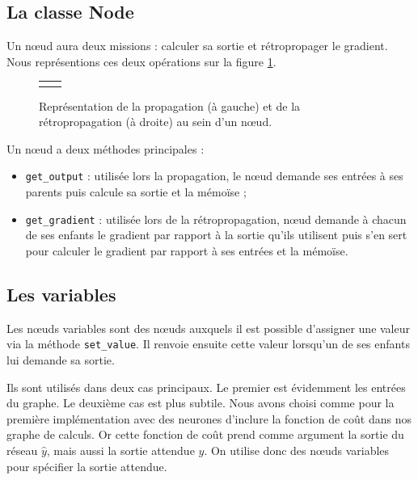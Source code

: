 \subsection{La classe Node}

Un n\oe{}ud aura deux missions : calculer sa sortie et rétropropager le gradient. Nous représentions ces deux opérations sur la figure \ref{node}.

\begin{figure}
\begin{center}
\begin{tabular}{cc}
 &  \\
\end{tabular}
\end{center}
\caption{Représentation de la propagation (à gauche) et de la rétropropagation (à droite) au sein d'un n\oe{}ud.}
\label{node}
\end{figure}

Un n\oe{}ud a deux méthodes principales :
\begin{itemize}
\item \texttt{get\_output} : utilisée lors la propagation, le n\oe{}ud demande ses entrées à ses parents puis calcule sa sortie et la mémoïse ;
\item \texttt{get\_gradient} : utilisée lors de la rétropropagation, n\oe{}ud demande à chacun de ses enfants le gradient par rapport à la sortie qu'ils utilisent puis s'en sert pour calculer le gradient par rapport à ses entrées et la mémoïse.
\end{itemize}

\subsection{Les variables}

Les n\oe{}uds variables sont des n\oe{}uds auxquels il est possible d'assigner une valeur via la méthode \texttt{set\_value}. Il renvoie ensuite cette valeur lorsqu'un de ses enfants lui demande sa sortie.

Ils sont utilisés dans deux cas principaux. Le premier est évidemment les entrées du graphe. Le deuxième cas est plus subtile. Nous avons choisi comme pour la première implémentation avec des neurones d'inclure la fonction de coût dans nos graphe de calculs. Or cette fonction de coût prend comme argument la sortie du réseau $\hat{y}$, mais aussi la sortie attendue $y$. On utilise donc des n\oe{}uds variables pour spécifier la sortie attendue.

